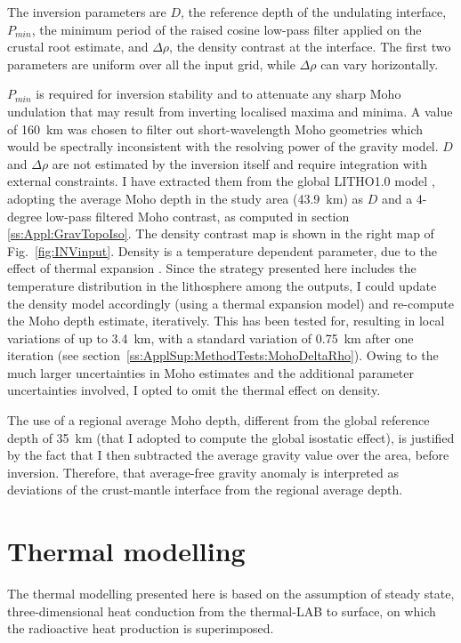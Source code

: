 The inversion parameters are $D$, the reference depth of the undulating interface, $P_{min}$, the minimum period of the raised cosine low-pass filter applied on the crustal root estimate, and $\Delta \rho$, the density contrast at the interface.
The first two parameters are uniform over all the input grid, while $\Delta \rho$ can vary horizontally.

$P_{min}$ is required for inversion stability and to attenuate any sharp Moho undulation that may result from inverting localised maxima and minima.
A value of 160~{km} was chosen to filter out short-wavelength Moho geometries which would be spectrally inconsistent with the resolving power of the gravity model.
$D$ and $\Delta \rho$ are not estimated by the inversion itself and require integration with external constraints.
I have extracted them from the global {LITHO1.0} model \parencite{Pasyanos2014}, adopting the average Moho depth in the study area (43.9~\si{\kilo \metre}) as $D$ and a 4-degree low-pass filtered Moho contrast, as computed in section \ref{ss:Appl:GravTopoIso}.
The density contrast map is shown in the right map of Fig.~\ref{fig:INVinput}.
Density is a temperature dependent parameter, due to the effect of thermal expansion \parencite{allen2013basin}.
Since the strategy presented here includes the temperature distribution in the lithosphere among the outputs, I could update the density model accordingly (using a thermal expansion model) and re-compute the Moho depth estimate, iteratively.
This has been tested for, resulting in local variations of up to \SI{3.4}{\kilo \metre}, with a standard variation of \SI{0.75}{\kilo \metre} after one iteration (see section~\ref{ss:ApplSup:MethodTests:MohoDeltaRho}).
Owing to the much larger uncertainties in Moho estimates \parencite[\textpm~5 to \textpm~15 percent, see ][]{Grad2009} and the additional parameter uncertainties involved, I opted to omit the thermal effect on density.

The use of a regional average Moho depth, different from the global reference depth of \SI{35}{\kilo \metre} (that I adopted to compute the global isostatic effect), is justified by the fact that I then subtracted the average gravity value over the area, before inversion.
Therefore, that average-free gravity anomaly is interpreted as deviations of the crust-mantle interface from the regional average depth.

\section{Thermal modelling}
\label{s:Appl:Therm}
The thermal modelling presented here is based on the assumption of steady state, three-dimensional heat conduction from the thermal-LAB to surface, on which the radioactive heat production is superimposed.

